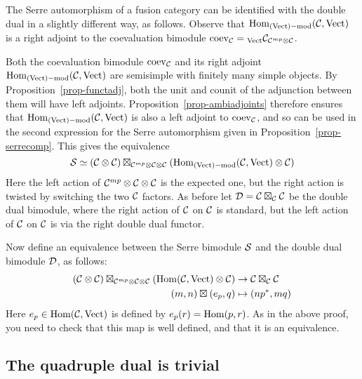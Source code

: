 \documentclass{amsart}
\begin{document}
\begin{remark}
The Serre automorphism of a fusion category can be identified with the double dual in a slightly different way, as follows.  Observe that $\operatorname{Hom}_{(\mathrm{Vect})-\mathrm{mod}}(\mathcal C,\mathrm{Vect})$ is a right adjoint to the coevaluation bimodule $\mathrm{coev}_{\mathcal C} = {}_{\mathrm{Vect}} {\mathcal C}_{\mathcal C^{mp} \otimes \mathcal C}$.    

Both the coevaluation bimodule $\mathrm{coev}_{\mathcal C}$ and its right adjoint $\operatorname{Hom}_{(\mathrm{Vect})-\mathrm{mod}}(\mathcal C,\mathrm{Vect})$ are semisimple with finitely many simple objects.  By Proposition~\ref{prop-functadj}, both the unit and counit of the adjunction between them will have left adjoints.  Proposition~\ref{prop-ambiadjoints} therefore ensures that $\operatorname{Hom}_{(\mathrm{Vect})-\mathrm{mod}}(\mathcal C,\mathrm{Vect})$ is also a left adjoint to $\mathrm{coev}_{\mathcal C}$, and so can be used in the second expression for the Serre automorphism given in Proposition~\ref{prop-serrecomp}.  This gives the equivalence
\begin{equation} \nonumber
\mathcal S \simeq (\mathcal C \otimes \mathcal C) \boxtimes_{\mathcal C^{mp} \otimes \mathcal C \otimes \mathcal C} (\operatorname{Hom}_{(\mathrm{Vect})-\mathrm{mod}}(\mathcal C,\mathrm{Vect}) \otimes \mathcal C)
\end{equation}
Here the left action of $\mathcal C^{mp} \otimes \mathcal C \otimes \mathcal C$ is the expected one, but the right action is twisted by switching the two $\mathcal C$ factors.  As before let $\mathcal D = \mathcal C \boxtimes_{\mathcal C} \mathcal C$ be the double dual bimodule, where the right action of $\mathcal C$ on $\mathcal C$ is standard, but the left action of $\mathcal C$ on $\mathcal C$ is via the right double dual functor.  

Now define an equivalence between the Serre bimodule $\mathcal S$ and the double dual bimodule $\mathcal D$, as follows:
\begin{align}
(\mathcal C \otimes \mathcal C) \boxtimes_{\mathcal C^{mp} \otimes \mathcal C \otimes \mathcal C} (\operatorname{Hom}(\mathcal C,\mathrm{Vect}) \otimes \mathcal C) & \rightarrow \mathcal C \boxtimes_{\mathcal C} \mathcal C \nonumber\\
(m, n) \boxtimes (e_p, q) & \mapsto (n {p}^*, mq)
\end{align}
Here $e_p \in \operatorname{Hom}(\mathcal C,\mathrm{Vect})$ is defined by $e_p(r) = \operatorname{Hom}(p,r)$.  As in the above proof, you need to check that this map is well defined, and that it is an equivalence.
\end{remark}

\subsection{The quadruple dual is trivial} \label{sec-serre-quad}
\end{document}
